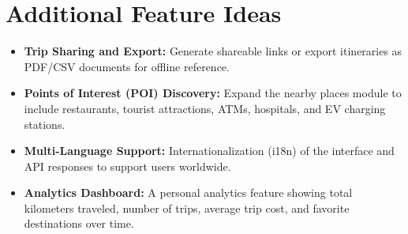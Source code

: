 \section{Additional Feature Ideas}
\begin{itemize}
    \item \textbf{Trip Sharing and Export:} Generate shareable links or export itineraries as PDF/CSV documents for offline reference.
    \item \textbf{Points of Interest (POI) Discovery:} Expand the nearby places module to include restaurants, tourist attractions, ATMs, hospitals, and EV charging stations.
    \item \textbf{Multi-Language Support:} Internationalization (i18n) of the interface and API responses to support users worldwide.
    \item \textbf{Analytics Dashboard:} A personal analytics feature showing total kilometers traveled, number of trips, average trip cost, and favorite destinations over time.
\end{itemize}
